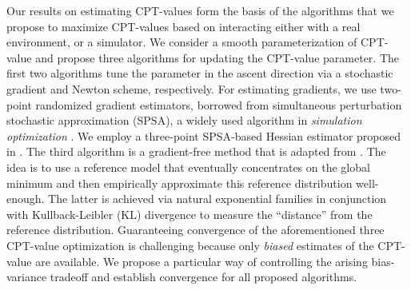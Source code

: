 Our results on estimating CPT-values form the basis of the algorithms that we propose to maximize CPT-values based on interacting either with a real environment, or a simulator. 
We consider a smooth parameterization of CPT-value and propose three algorithms for updating the CPT-value parameter. The first two algorithms tune the parameter in the ascent direction via a stochastic gradient and Newton scheme, respectively. For estimating gradients, we use two-point randomized gradient estimators, borrowed from simultaneous perturbation stochastic approximation (SPSA), a widely used algorithm in \textit{simulation optimization} \cite{fu2015handbook}. We employ a three-point SPSA-based Hessian estimator proposed in \cite{bhatnagar2015simultaneous}. 
The third algorithm is a gradient-free method that is adapted from \cite{chang2013simulation}. The idea is to use a reference model that eventually concentrates on the global minimum and then empirically approximate this reference distribution well-enough. The latter is achieved via natural exponential families in conjunction with Kullback-Leibler (KL) divergence to measure the ``distance'' from the reference distribution. 
Guaranteeing convergence of the aforementioned three CPT-value optimization is challenging because only  \emph{biased} estimates of the CPT-value are available. We propose a particular way of controlling the arising bias-variance tradeoff and establish convergence for all proposed algorithms.

